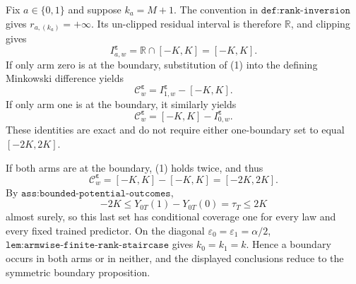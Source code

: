 Fix \(a\in\{0,1\}\) and suppose \(k_a=M+1\). The convention in \(\texttt{def:rank-inversion}\) gives \(r_{a,(k_a)}=+\infty\). Its un-clipped residual interval is therefore \(\mathbb R\), and clipping gives
\[
I^{\boldsymbol\varepsilon}_{a,w}=\mathbb R\cap[-K,K]=[-K,K].
\tag{1}
\]
If only arm zero is at the boundary, substitution of (1) into the defining Minkowski difference yields
\[
\mathcal C^{\boldsymbol\varepsilon}_w=I^{\boldsymbol\varepsilon}_{1,w}-[-K,K].
\]
If only arm one is at the boundary, it similarly yields
\[
\mathcal C^{\boldsymbol\varepsilon}_w=[-K,K]-I^{\boldsymbol\varepsilon}_{0,w}.
\]
These identities are exact and do not require either one-boundary set to equal \([-2K,2K]\).

If both arms are at the boundary, (1) holds twice, and thus
\[
\mathcal C^{\boldsymbol\varepsilon}_w=[-K,K]-[-K,K]=[-2K,2K].
\]
By \(\texttt{ass:bounded-potential-outcomes}\),
\[
-2K\le Y_{0T}(1)-Y_{0T}(0)=\tau_T\le2K
\]
almost surely, so this last set has conditional coverage one for every law and every fixed trained predictor. On the diagonal \(\varepsilon_0=\varepsilon_1=\alpha/2\), \(\texttt{lem:armwise-finite-rank-staircase}\) gives \(k_0=k_1=k\). Hence a boundary occurs in both arms or in neither, and the displayed conclusions reduce to the symmetric boundary proposition.
